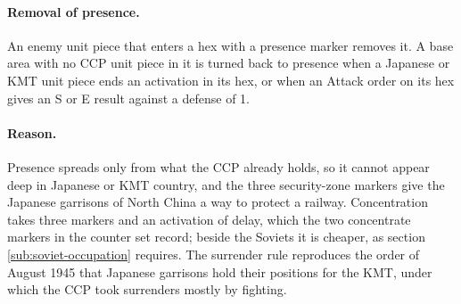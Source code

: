 \documentclass[11pt]{article}
\begin{document}
\paragraph{Removal of presence.} An enemy unit piece that enters a hex with a presence marker removes it. A base area with no CCP unit piece in it is turned back to presence when a Japanese or KMT unit piece ends an activation in its hex, or when an Attack order on its hex gives an S or E result against a defense of 1.

\paragraph{Reason.} Presence spreads only from what the CCP already holds, so it cannot appear deep in Japanese or KMT country, and the three security-zone markers give the Japanese garrisons of North China a way to protect a railway. Concentration takes three markers and an activation of delay, which the two concentrate markers in the counter set record; beside the Soviets it is cheaper, as section \ref{sub:soviet-occupation} requires. The surrender rule reproduces the order of August 1945 that Japanese garrisons hold their positions for the KMT, under which the CCP took surrenders mostly by fighting.
\end{document}
